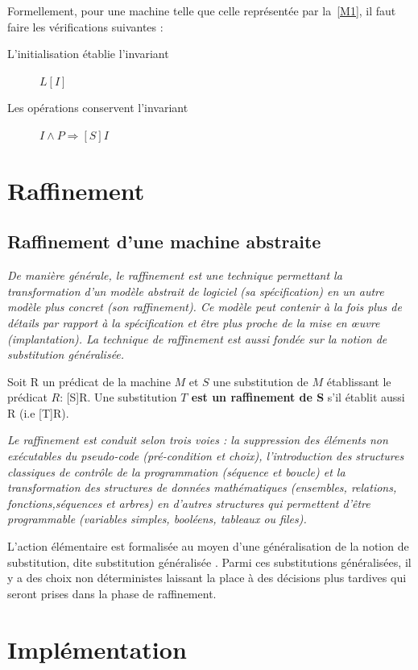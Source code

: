 \documentclass[10pt,a4paper]{article}
\begin{document}
Formellement, pour une machine telle que celle représentée par la~\cref{M1}, il faut faire les vérifications suivantes :
\begin{description}
\item[L'initialisation établie l'invariant] $L[I]$ 
\item[Les opérations conservent l'invariant] $I \wedge P \Rightarrow [S]I$ 
\end{description}


\section{Raffinement}

\subsection{Raffinement d'une machine abstraite}
\emph{De manière générale, le raffinement est une technique permettant la transformation d'un modèle abstrait de logiciel (sa spécification) en un autre modèle plus concret (son raffinement). Ce modèle peut contenir à la fois plus de détails par rapport à la spécification et être plus proche de la mise en œuvre (implantation). La technique de raffinement est aussi fondée sur la notion de substitution généralisée.}\cite{dossierTechnique}

Soit R un prédicat de la machine $M$ et $S$ une substitution de $M$ établissant le prédicat $R$: [S]R.
Une substitution \textbf{$T$ est un raffinement de S} s'il établit aussi R (i.e [T]R).

\emph{Le raffinement est conduit selon trois voies : la suppression des éléments non exécutables du pseudo-code (pré-condition et choix), l'introduction des structures classiques de contrôle de la programmation (séquence et boucle) et la transformation des structures de données mathématiques (ensembles, relations, fonctions,séquences et arbres) en d’autres structures qui permettent d’être programmable (variables simples, booléens, tableaux ou files).}\cite{dossierTechnique}

L’action élémentaire est formalisée au moyen d’une généralisation de la notion de substitution, dite \og substitution généralisée \fg. Parmi ces substitutions généralisées,
il y a des choix non déterministes laissant la place à des décisions plus tardives qui seront prises dans la phase de raffinement.

\section{Implémentation}
\end{document}
